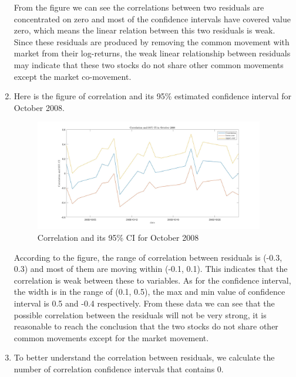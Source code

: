 \documentclass[12pt,letterpaper]{article}
\begin{document}
\begin{enumerate}[label=\textbf{(\Alph*)}]
From the figure we can see the correlations between two residuals are concentrated on zero and most of the confidence intervals have covered value zero, which means the linear relation between this two residuals is weak. Since these residuals are produced by removing the common movement with market from their log-returns, the weak linear relationship between residuals may indicate that these two stocks do not share other common movements except the market co-movement.\\




\item Here is the figure of correlation and its 95\% estimated confidence interval for October 2008.
\begin{figure}[H]
           \centering
            \includegraphics[width=10cm]{figures/q3_g.jpg}
            \centering
            \caption{Correlation and its 95\% CI for October 2008}
\end{figure}

According to the figure, the range of correlation between residuals is (-0.3, 0.3) and most of them are moving within (-0.1, 0.1). This indicates that the correlation is weak between these to variables. As for the confidence interval, the width is in the range of (0.1, 0.5), the max and min value of confidence interval is 0.5 and -0.4 respectively. From these data we can see that the possible correlation between the residuals will not be very strong, it is reasonable to reach the conclusion that the two stocks do not share other common movements except for the market movement.


\item To better understand the correlation between residuals, we calculate the number of correlation confidence intervals that contains 0.


\end{enumerate}
\end{document}
